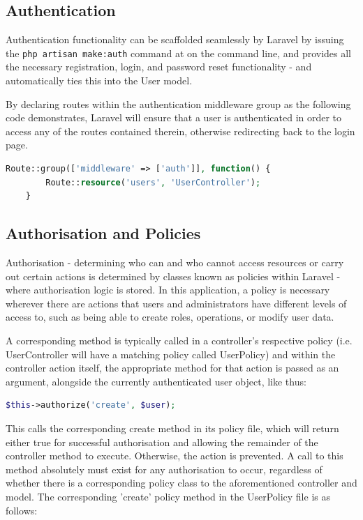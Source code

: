 \subsection{Authentication}
Authentication functionality can be scaffolded seamlessly by Laravel by issuing the \texttt{php artisan make:auth} command at on the command line, and provides all the necessary registration, login, and password reset functionality - and automatically ties this into the User model.

By declaring routes within the authentication middleware group as the following code demonstrates, Laravel will ensure that a user is authenticated in order to access any of the routes contained therein, otherwise redirecting back to the login page. \cite{Laravel8}

\begin{lstlisting}[language=PHP, breaklines]
    Route::group(['middleware' => ['auth']], function() {
        Route::resource('users', 'UserController');
    }
\end{lstlisting}

\subsection{Authorisation and Policies}
Authorisation - determining who can and who cannot access resources or carry out certain actions is determined by classes known as policies within Laravel - where authorisation logic is stored. \cite{Larashout1} In this application, a policy is necessary wherever there are actions that users and administrators have different levels of access to, such as being able to create roles, operations, or modify user data.

A corresponding method is typically called in a controller's respective policy (i.e. UserController will have a matching policy called UserPolicy) and within the controller action itself, the appropriate method for that action is passed as an argument, alongside the currently authenticated user object, like thus:

\begin{lstlisting}[language=PHP, breaklines]
    $this->authorize('create', $user);
\end{lstlisting}

This calls the corresponding create method in its policy file, which will return either true for successful authorisation and allowing the remainder of the controller method to execute. Otherwise, the action is prevented. A call to this method absolutely must exist for any authorisation to occur, regardless of whether there is a corresponding policy class to the aforementioned controller and model. The corresponding 'create' policy method in the UserPolicy file is as follows:

